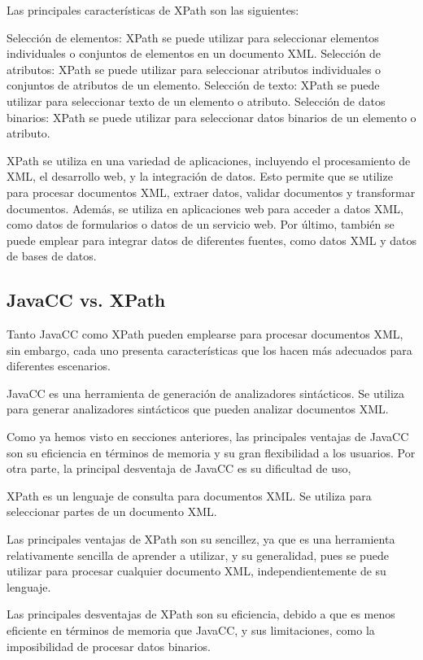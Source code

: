Las principales características de XPath son las siguientes:

Selección de elementos: XPath se puede utilizar para seleccionar elementos individuales o conjuntos de elementos en un documento XML.
Selección de atributos: XPath se puede utilizar para seleccionar atributos individuales o conjuntos de atributos de un elemento.
Selección de texto: XPath se puede utilizar para seleccionar texto de un elemento o atributo.
Selección de datos binarios: XPath se puede utilizar para seleccionar datos binarios de un elemento o atributo.

XPath se utiliza en una variedad de aplicaciones, incluyendo el procesamiento de XML, el desarrollo web, y la integración de datos. Esto permite que se utilize para procesar documentos XML, extraer datos, validar documentos y transformar documentos. Además, se utiliza en aplicaciones web para acceder a datos XML, como datos de formularios o datos de un servicio web. Por último, también se puede emplear para integrar datos de diferentes fuentes, como datos XML y datos de bases de datos.

\subsection{JavaCC vs. XPath}

\noindent Tanto JavaCC como XPath pueden emplearse para procesar documentos XML, sin embargo, cada uno presenta características que los hacen más adecuados para diferentes escenarios.

JavaCC es una herramienta de generación de analizadores sintácticos. Se utiliza para generar analizadores sintácticos que pueden analizar documentos XML.

Como ya hemos visto en secciones anteriores, las principales ventajas de JavaCC son su eficiencia en términos de memoria y su gran flexibilidad a los usuarios. Por otra parte, la principal desventaja de JavaCC es su dificultad de uso,

XPath es un lenguaje de consulta para documentos XML. Se utiliza para seleccionar partes de un documento XML.

Las principales ventajas de XPath son su sencillez, ya que es una herramienta relativamente sencilla de aprender a utilizar, y su generalidad, pues se puede utilizar para procesar cualquier documento XML, independientemente de su lenguaje.

Las principales desventajas de XPath son su eficiencia, debido a que es menos eficiente en términos de memoria que JavaCC, y sus limitaciones, como la imposibilidad de procesar datos binarios.

